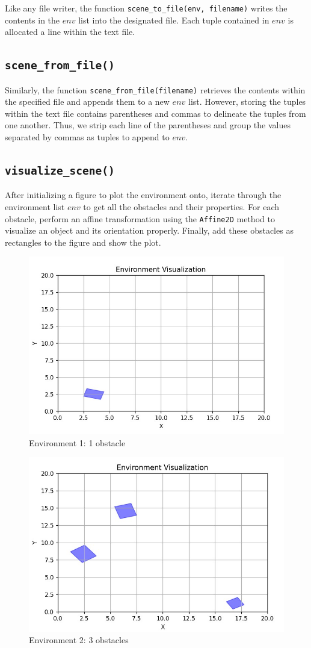 \documentclass{article}
\begin{document}
Like any file writer, the function \texttt{scene\_to\_file(env, filename)} writes the contents in the $env$ list into the designated file. Each tuple contained in $env$ is allocated a line within the text file.

\subsection{\texttt{scene\_from\_file()}}

Similarly, the function \texttt{scene\_from\_file(filename)} retrieves the contents within the specified file and appends them to a new $env$ list. However, storing the tuples within the text file contains parentheses and commas to delineate the tuples from one another. Thus, we strip each line of the parentheses and group the values separated by commas as tuples to append to $env$.

\subsection{\texttt{visualize\_scene()}}

After initializing a figure to plot the environment onto, iterate through the environment list $env$ to get all the obstacles and their properties. For each obstacle, perform an affine transformation using the \texttt{Affine2D} method to visualize an object and its orientation properly. Finally, add these obstacles as rectangles to the figure and show the plot.

\begin{figure} [H]
    \centering
    \includegraphics[width=0.7\linewidth]{latex_media/env1.jpg}
    \caption{Environment 1: 1 obstacle}
\end{figure}

\begin{figure} [H]
    \centering
    \includegraphics[width=0.7\linewidth]{latex_media/env2.jpg}
    \caption{Environment 2: 3 obstacles}
\end{figure}
\end{document}
